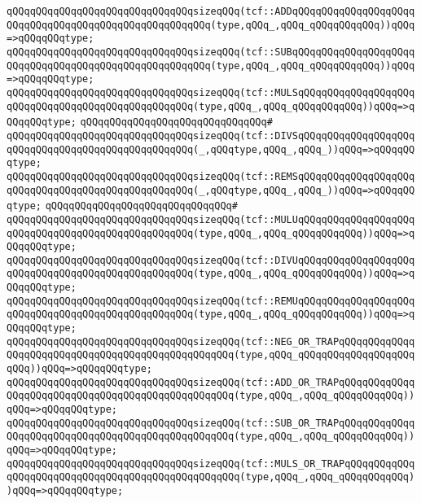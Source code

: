 \verb|qQQqqQQqqQQqqQQqqQQqqQQqqQQqqQQqsizeqQQq(tcf::ADDqQQqqQQqqQQqqQQqqQQqqQQqqQQqqQQqqQQqqQQqqQQqqQQqqQQqqQQq(type,qQQq_,qQQq_qQQqqQQqqQQq))qQQq=>qQQqqQQqtype;|\newline
\verb|qQQqqQQqqQQqqQQqqQQqqQQqqQQqqQQqsizeqQQq(tcf::SUBqQQqqQQqqQQqqQQqqQQqqQQqqQQqqQQqqQQqqQQqqQQqqQQqqQQqqQQq(type,qQQq_,qQQq_qQQqqQQqqQQq))qQQq=>qQQqqQQqtype;|\newline
\verb|qQQqqQQqqQQqqQQqqQQqqQQqqQQqqQQqsizeqQQq(tcf::MULSqQQqqQQqqQQqqQQqqQQqqQQqqQQqqQQqqQQqqQQqqQQqqQQqqQQq(type,qQQq_,qQQq_qQQqqQQqqQQq))qQQq=>qQQqqQQqtype;|\newline
\verb|qQQqqQQqqQQqqQQqqQQqqQQqqQQqqQQq#|\newline
\verb|qQQqqQQqqQQqqQQqqQQqqQQqqQQqqQQqsizeqQQq(tcf::DIVSqQQqqQQqqQQqqQQqqQQqqQQqqQQqqQQqqQQqqQQqqQQqqQQqqQQq(_,qQQqtype,qQQq_,qQQq_))qQQq=>qQQqqQQqtype;|\newline
\verb|qQQqqQQqqQQqqQQqqQQqqQQqqQQqqQQqsizeqQQq(tcf::REMSqQQqqQQqqQQqqQQqqQQqqQQqqQQqqQQqqQQqqQQqqQQqqQQqqQQq(_,qQQqtype,qQQq_,qQQq_))qQQq=>qQQqqQQqtype;|\newline
\verb|qQQqqQQqqQQqqQQqqQQqqQQqqQQqqQQq#|\newline
\verb|qQQqqQQqqQQqqQQqqQQqqQQqqQQqqQQqsizeqQQq(tcf::MULUqQQqqQQqqQQqqQQqqQQqqQQqqQQqqQQqqQQqqQQqqQQqqQQqqQQq(type,qQQq_,qQQq_qQQqqQQqqQQq))qQQq=>qQQqqQQqtype;|\newline
\verb|qQQqqQQqqQQqqQQqqQQqqQQqqQQqqQQqsizeqQQq(tcf::DIVUqQQqqQQqqQQqqQQqqQQqqQQqqQQqqQQqqQQqqQQqqQQqqQQqqQQq(type,qQQq_,qQQq_qQQqqQQqqQQq))qQQq=>qQQqqQQqtype;|\newline
\verb|qQQqqQQqqQQqqQQqqQQqqQQqqQQqqQQqsizeqQQq(tcf::REMUqQQqqQQqqQQqqQQqqQQqqQQqqQQqqQQqqQQqqQQqqQQqqQQqqQQq(type,qQQq_,qQQq_qQQqqQQqqQQq))qQQq=>qQQqqQQqtype;|\newline
\verb|qQQqqQQqqQQqqQQqqQQqqQQqqQQqqQQqsizeqQQq(tcf::NEG_OR_TRAPqQQqqQQqqQQqqQQqqQQqqQQqqQQqqQQqqQQqqQQqqQQqqQQqqQQq(type,qQQq_qQQqqQQqqQQqqQQqqQQqqQQq))qQQq=>qQQqqQQqtype;|\newline
\verb|qQQqqQQqqQQqqQQqqQQqqQQqqQQqqQQqsizeqQQq(tcf::ADD_OR_TRAPqQQqqQQqqQQqqQQqqQQqqQQqqQQqqQQqqQQqqQQqqQQqqQQqqQQq(type,qQQq_,qQQq_qQQqqQQqqQQq))qQQq=>qQQqqQQqtype;|\newline
\verb|qQQqqQQqqQQqqQQqqQQqqQQqqQQqqQQqsizeqQQq(tcf::SUB_OR_TRAPqQQqqQQqqQQqqQQqqQQqqQQqqQQqqQQqqQQqqQQqqQQqqQQqqQQq(type,qQQq_,qQQq_qQQqqQQqqQQq))qQQq=>qQQqqQQqtype;|\newline
\verb|qQQqqQQqqQQqqQQqqQQqqQQqqQQqqQQqsizeqQQq(tcf::MULS_OR_TRAPqQQqqQQqqQQqqQQqqQQqqQQqqQQqqQQqqQQqqQQqqQQqqQQqqQQq(type,qQQq_,qQQq_qQQqqQQqqQQq))qQQq=>qQQqqQQqtype;|\newline
